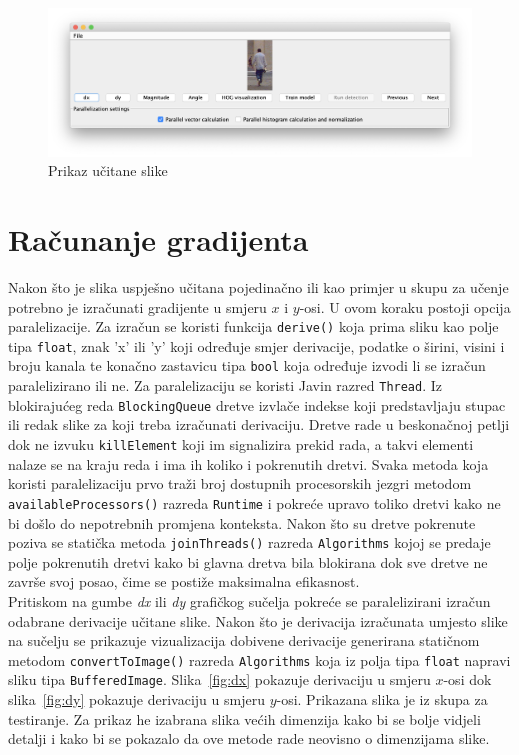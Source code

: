 \documentclass[times, utf8, zavrsni]{fer}
\begin{document}
\begin{figure}[htb]
	\centering
	\includegraphics[width=\linewidth]{figures/loadedImage.png}
	\caption{Prikaz učitane slike}
	\label{fig:loadedImage}
\end{figure}

\section{Računanje gradijenta}
Nakon što je slika uspješno učitana pojedinačno ili kao primjer u skupu za učenje potrebno je izračunati gradijente u smjeru \(x\) i \(y\)-osi. U ovom koraku postoji opcija paralelizacije. Za izračun se koristi funkcija \verb|derive()| koja prima sliku kao polje tipa \verb|float|, znak 'x' ili 'y' koji određuje smjer derivacije, podatke o širini, visini i broju kanala te konačno zastavicu tipa \verb|bool| koja određuje izvodi li se izračun paralelizirano ili ne. Za paralelizaciju se koristi Javin razred \verb|Thread|. Iz blokirajućeg reda \verb|BlockingQueue| dretve izvlače indekse koji predstavljaju stupac ili redak slike za koji treba izračunati derivaciju. Dretve rade u beskonačnoj petlji dok ne izvuku \verb|killElement| koji im signalizira prekid rada, a takvi elementi nalaze se na kraju reda i ima ih koliko i pokrenutih dretvi. Svaka metoda koja koristi paralelizaciju prvo traži broj dostupnih procesorskih jezgri metodom \verb|availableProcessors()| razreda \verb|Runtime| i pokreće upravo toliko dretvi kako ne bi došlo do nepotrebnih promjena konteksta. Nakon što su dretve pokrenute poziva se statička metoda \verb|joinThreads()| razreda \verb|Algorithms| kojoj se predaje polje pokrenutih dretvi kako bi glavna dretva bila blokirana dok sve dretve ne završe svoj posao, čime se postiže maksimalna efikasnost. \\

Pritiskom na gumbe \textit{dx} ili \textit{dy} grafičkog sučelja pokreće se paralelizirani izračun odabrane derivacije učitane slike. Nakon što je derivacija izračunata umjesto slike na sučelju se prikazuje vizualizacija dobivene derivacije generirana statičnom metodom \verb|convertToImage()| razreda \verb|Algorithms| koja iz polja tipa \verb|float| napravi sliku tipa \verb|BufferedImage|. Slika~\ref{fig:dx} pokazuje derivaciju u smjeru \(x\)-osi dok slika~\ref{fig:dy} pokazuje derivaciju u smjeru \(y\)-osi. Prikazana slika je iz skupa za testiranje. Za prikaz he izabrana slika većih dimenzija kako bi se bolje vidjeli detalji i kako bi se pokazalo da ove metode rade neovisno o dimenzijama slike.
\end{document}
